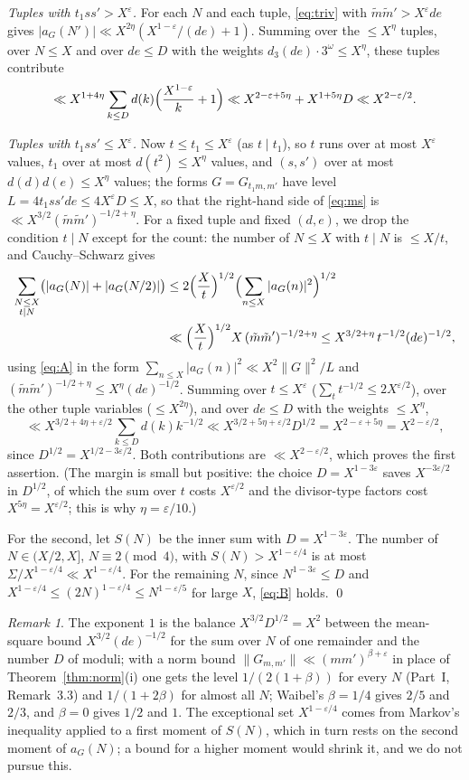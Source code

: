 ﻿\documentclass[11pt]{amsart}
\theoremstyle{remark}
\newtheorem{remark}[theorem]{Remark}
\newcommand{\e}{\varepsilon}
\begin{document}
\emph{Tuples with $t_1ss'>X^\e$.} For each $N$ and each tuple, \eqref{eq:triv} with $\tilde m\tilde m'>X^\e de$ gives $|a_G(N')|\ll X^{2\eta}(X^{1-\e}/(de)+1)$. Summing over the $\le X^\eta$ tuples, over $N\le X$ and over $de\le D$ with the weights $d_3(de)\cdot3^{\omega}\le X^\eta$, these tuples contribute
\[
\ll X^{1+4\eta}\sum_{k\le D}d(k)\Bigl(\frac{X^{1-\e}}{k}+1\Bigr)\ll X^{2-\e+5\eta}+X^{1+5\eta}D\ll X^{2-\e/2}.
\]

\emph{Tuples with $t_1ss'\le X^\e$.} Now $t\le t_1\le X^\e$ (as $t\mid t_1$), so $t$ runs over at most $X^\e$ values, $t_1$ over at most $d(t^2)\le X^\eta$ values, and $(s,s')$ over at most $d(d)d(e)\le X^\eta$ values; the forms $G=G_{t_1m,m'}$ have level $L=4t_1ss'de\le4X^\e D\le X$, so that the right-hand side of \eqref{eq:ms} is $\ll X^{3/2}(\tilde m\tilde m')^{-1/2+\eta}$. For a fixed tuple and fixed $(d,e)$, we drop the condition $t\mid N$ except for the count: the number of $N\le X$ with $t\mid N$ is $\le X/t$, and Cauchy--Schwarz gives
\begin{align*}
\sum_{\substack{N\le X\\ t\mid N}}\bigl(|a_G(N)|+|a_G(N/2)|\bigr)&\le2\Bigl(\frac Xt\Bigr)^{1/2}\Bigl(\sum_{n\le X}|a_G(n)|^2\Bigr)^{1/2}\\
&\ll\Bigl(\frac Xt\Bigr)^{1/2}X\,(\tilde m\tilde m')^{-1/2+\eta}\le X^{3/2+\eta}\,t^{-1/2}(de)^{-1/2},
\end{align*}
using \eqref{eq:A} in the form $\sum_{n\le X}|a_G(n)|^2\ll X^2\|G\|^2/L$ and $(\tilde m\tilde m')^{-1/2+\eta}\le X^{\eta}(de)^{-1/2}$. Summing over $t\le X^\e$ ($\sum_t t^{-1/2}\le2X^{\e/2}$), over the other tuple variables ($\le X^{2\eta}$), and over $de\le D$ with the weights $\le X^\eta$,
\[
\ll X^{3/2+4\eta+\e/2}\sum_{k\le D}d(k)k^{-1/2}\ll X^{3/2+5\eta+\e/2}D^{1/2}=X^{2-\e+5\eta}=X^{2-\e/2},
\]
since $D^{1/2}=X^{1/2-3\e/2}$. Both contributions are $\ll X^{2-\e/2}$, which proves the first assertion. (The margin is small but positive: the choice $D=X^{1-3\e}$ saves $X^{-3\e/2}$ in $D^{1/2}$, of which the sum over $t$ costs $X^{\e/2}$ and the divisor-type factors cost $X^{5\eta}=X^{\e/2}$; this is why $\eta=\e/10$.)

For the second, let $S(N)$ be the inner sum with $D=X^{1-3\e}$. The number of $N\in(X/2,X]$, $N\equiv2\pmod 4$, with $S(N)>X^{1-\e/4}$ is at most $\Sigma/X^{1-\e/4}\ll X^{1-\e/4}$. For the remaining $N$, since $N^{1-3\e}\le D$ and $X^{1-\e/4}\le(2N)^{1-\e/4}\le N^{1-\e/5}$ for large $X$, \eqref{eq:B} holds. \qed

\begin{remark}
The exponent $1$ is the balance $X^{3/2}D^{1/2}=X^{2}$ between the mean-square bound $X^{3/2}(de)^{-1/2}$ for the sum over $N$ of one remainder and the number $D$ of moduli; with a norm bound $\|G_{m,m'}\|\ll(mm')^{\beta+\e}$ in place of Theorem~\ref{thm:norm}(i) one gets the level $1/(2(1+\beta))$ for every $N$ (Part~I, Remark~3.3) and $1/(1+2\beta)$ for almost all $N$; Waibel's $\beta=1/4$ gives $2/5$ and $2/3$, and $\beta=0$ gives $1/2$ and $1$. The exceptional set $X^{1-\e/4}$ comes from Markov's inequality applied to a first moment of $S(N)$, which in turn rests on the second moment of $a_G(N)$; a bound for a higher moment would shrink it, and we do not pursue this.
\end{remark}
\end{document}
